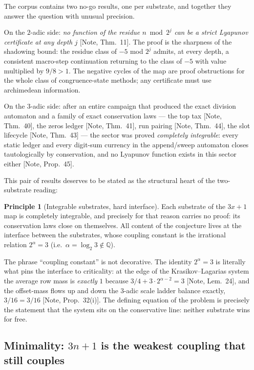 \documentclass[11pt]{article}
\theoremstyle{definition}
\newtheorem{principle}[theorem]{Principle}
\theoremstyle{remark}
\newcommand{\anchor}[1]{\textup{[#1]}}
\begin{document}
The corpus contains two no-go results, one per substrate, and together they
answer the question with unusual precision.

On the $2$-adic side: \emph{no function of the residue $n \bmod 2^j$ can be a
strict Lyapunov certificate at any depth $j$} \anchor{Note, Thm.~11}. The
proof is the sharpness of the shadowing bound: the residue class of $-5$ mod
$2^j$ admits, at every depth, a consistent macro-step continuation returning
to the class of $-5$ with value multiplied by $9/8 > 1$. The negative cycles
of the map are proof obstructions for the whole class of congruence-state
methods; any certificate must use archimedean information.

On the $3$-adic side: after an entire campaign that produced the exact
division automaton and a family of exact conservation laws --- the top tax
\anchor{Note, Thm.~40}, the zeros ledger \anchor{Note, Thm.~41}, run pairing
\anchor{Note, Thm.~44}, the slot lifecycle \anchor{Note, Thm.~43} --- the
sector was proved \emph{completely integrable}: every static ledger and every
digit-sum currency in the append/sweep automaton closes tautologically by
conservation, and no Lyapunov function exists in this sector either
\anchor{Note, Prop.~45}.

This pair of results deserves to be stated as the structural heart of the
two-substrate reading:

\begin{principle}[Integrable substrates, hard interface]
\label{prin:interface}
Each substrate of the $3x+1$ map is completely integrable, and precisely for
that reason carries no proof: its conservation laws close on themselves. All
content of the conjecture lives at the interface between the substrates,
whose coupling constant is the irrational relation $2^{\alpha} = 3$
(i.e.\ $\alpha = \log_2 3 \notin \mathbb{Q}$).
\end{principle}

The phrase ``coupling constant'' is not decorative. The identity $2^\alpha=3$
is literally what pins the interface to criticality: at the edge of the
Krasikov--Lagarias system the average row mass is \emph{exactly} $1$ because
$3/4 + 3\cdot 2^{\alpha-2} = 3$ \anchor{Note, Lem.~24}, and the offset-mass
flows up and down the $3$-adic scale ladder balance exactly, $3/16 = 3/16$
\anchor{Note, Prop.~32(i)}. The defining equation of the problem is precisely
the statement that the system sits on the conservative line: neither substrate
wins for free.

\subsection{Minimality: $3n+1$ is the weakest coupling that still couples}
\end{document}
